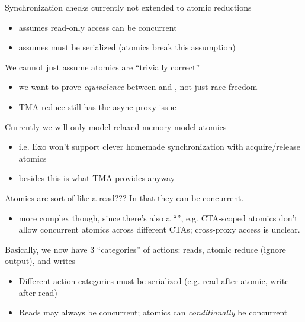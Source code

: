 \newpage
{}

Synchronization checks currently not extended to atomic reductions
\begin{itemize}
  \item assumes read-only access can be concurrent
  \item assumes  must be serialized (atomics break this assumption)
\end{itemize}

We cannot just assume atomics are ``trivially correct''
\begin{itemize}
  \item we want to prove \textit{equivalence} between  and , not just race freedom
  \item TMA reduce still has the async proxy issue
\end{itemize}

Currently we will only model relaxed memory model atomics
\begin{itemize}
  \item i.e. Exo won't support clever homemade synchronization with acquire/release atomics
  \item besides this is what TMA provides anyway
\end{itemize}

Atomics are sort of like a read??? In that they can be concurrent.
\begin{itemize}
  \item more complex though, since there's also a ``'', e.g. CTA-scoped atomics don't allow concurrent atomics across different CTAs; cross-proxy access is unclear.
\end{itemize}

Basically, we now have 3 ``categories'' of actions: reads, atomic reduce (ignore output), and writes
\begin{itemize}
  \item Different action categories must be serialized (e.g. read after atomic, write after read)
  \item Reads may always be concurrent; atomics can \textit{conditionally} be concurrent
\end{itemize}

\newpage
{}

